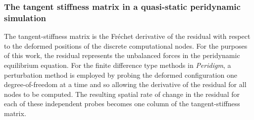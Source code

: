 \documentclass[preprint,12pt]{elsarticle}
\begin{document}
\subsubsection{The tangent stiffness matrix in a quasi-static peridynamic simulation}
The tangent-stiffness matrix is the Fr\'{e}chet derivative of the residual with respect to the deformed positions of the discrete computational nodes.  For the purposes of this work, the residual represents the unbalanced forces in the peridynamic equilibrium equation.  For the finite difference type methods in \emph{Peridigm}, a perturbation method is employed by probing the deformed configuration one degree-of-freedom at a time and so allowing the derivative of the residual for all nodes to be computed.  The resulting spatial rate of change in the residual for each of these independent probes becomes one column of the tangent-stiffness matrix.
\end{document}
